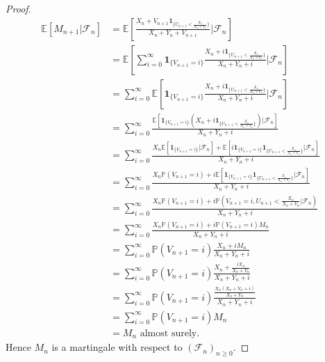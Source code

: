 \documentclass{article}
\begin{document}
\begin{proof}
\begin{align*}\mathbb{E}[M_{n+1}|\mathcal{F}_n]&=\mathbb{E}\left[\frac{X_n+V_{n+1}\mathbf{1}_{\{U_{n+1}<\frac{X_n}{X_n+Y_n}\}}}{X_n+Y_n+V_{n+1}}|\mathcal{F}_n\right]\\&=\mathbb{E}\left[\sum_{i=0}^\infty\mathbf{1}_{\{V_{n+1}=i\}}\frac{X_n+i\mathbf{1}_{\{U_{n+1}<\frac{X_n}{X_n+Y_n}\}}}{X_n+Y_n+i}|\mathcal{F}_n\right]\\&=\sum_{i=0}^\infty\mathbb{E}\left[\mathbf{1}_{\{V_{n+1}=i\}}\frac{X_n+i\mathbf{1}_{\{U_{n+1}<\frac{X_n}{X_n+Y_n}\}}}{X_n+Y_n+i}|\mathcal{F}_n\right]\\&=\sum_{i=0}^\infty\frac{\mathbb{E}[\mathbf{1}_{\{V_{n+1}=i\}}(X_n+i\mathbf{1}_{\{U_{n+1}<\frac{X_n}{X_n+Y_n}\}})|\mathcal{F}_n]}{X_n+Y_n+i}\\&=\sum_{i=0}^\infty\frac{X_n\mathbb{E}[\mathbf{1}_{\{V_{n+1}=i\}}|\mathcal{F}_n]+\mathbb{E}[i\mathbf{1}_{\{V_{n+1}=i\}}\mathbf{1}_{\{U_{n+1}<\frac{X_n}{X_n+Y_n}\}}|\mathcal{F}_n]}{X_n+Y_n+i}\\&=\sum_{i=0}^\infty\frac{X_n\mathbb{P}(V_{n+1}=i)+i\mathbb{E}[\mathbf{1}_{\{V_{n+1}=i\}}\mathbf{1}_{\{U_{n+1}<\frac{X_n}{X_n+Y_n}\}}|\mathcal{F}_n]}{X_n+Y_n+i}\\&=\sum_{i=0}^\infty\frac{X_n\mathbb{P}(V_{n+1}=i)+i\mathbb{P}(V_{n+1}=i,U_{n+1}<\frac{X_n}{X_n+Y_n}|\mathcal{F}_n)}{X_n+Y_n+i}\\&=\sum_{i=0}^\infty\frac{X_n\mathbb{P}(V_{n+1}=i)+i\mathbb{P}(V_{n+1}=i)M_n}{X_n+Y_n+i}\\&=\sum_{i=0}^\infty\mathbb{P}(V_{n+1}=i)\frac{X_n+iM_n}{X_n+Y_n+i}\\&=\sum_{i=0}^\infty\mathbb{P}(V_{n+1}=i)\frac{X_n+\frac{iX_n}{X_n+Y_n}}{X_n+Y_n+i}\\&=\sum_{i=0}^\infty\mathbb{P}(V_{n+1}=i)\frac{\frac{X_n(X_n+Y_n+i)}{X_n+Y_n}}{X_n+Y_n+i}\\&=\sum_{i=0}^\infty\mathbb{P}(V_{n+1}=i)M_n\\&=M_n\text{ almost surely.}\end{align*}
Hence $M_n$ is a martingale with respect to $(\mathcal{F}_n)_{n\geq0}$.
\end{proof}
\end{document}
